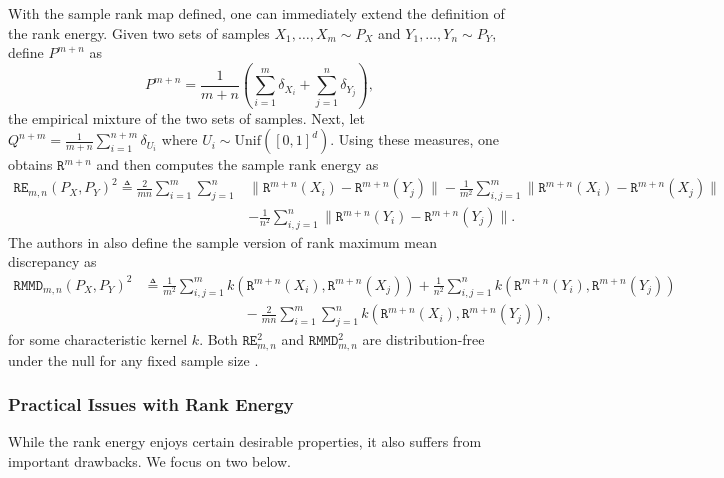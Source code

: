 \documentclass{article}
\theoremstyle{definition}
\newcommand{\Rn}{\mathtt{R}^{m+n}}
\newcommand{\REn}{\mathtt{RE}_{m,n}}
\begin{document}
With the sample rank map defined, one can immediately extend the definition of the rank energy. Given two sets of samples $X_1, \dots, X_m \sim P_X$ and $Y_1, \dots, Y_n \sim P_Y$, define $P^{m+n}$ as
\begin{equation*}
    P^{m+n} = \frac{1}{m+n}\left ( \sum_{i=1}^m \delta_{X_i} + \sum_{j=1}^n \delta_{Y_j} \right ),
\end{equation*} 
the empirical mixture of the two sets of samples. Next, let $Q^{n+m} =  \frac{1}{m+n}\sum_{i=1}^{n+m} \delta_{U_i}$ where $U_i \sim \text{Unif}([0,1]^d)$. Using these measures, one obtains $\Rn$ and then computes the sample rank energy as 
\begin{align} 
    \REn(P_X,P_Y)^2 \triangleq \frac{2}{mn}\sum_{i=1}^{m}\sum_{j=1}^n& \|\Rn(X_i)- \Rn(Y_j)\|- \frac{1}{m^2}\sum_{i,j=1}^{m}\|\Rn(X_i)- \Rn(X_j)\| \nonumber \\
    &- \frac{1}{n^2}\sum_{i,j=1}^{n}\|\Rn(Y_i)- \Rn(Y_j)\|. \label{eq:sre_mn}
\end{align}
The authors in \cite{deb2021multivariate} also define the sample version of rank maximum mean discrepancy as
\begin{align} 
        \mathtt{RMMD}_{m,n}(P_X,P_Y)^2 &\triangleq  \frac{1}{m^2} \sum_{i,j=1}^m k(\Rn(X_i),\Rn(X_j)) + \frac{1}{n^2} \sum_{i,j=1}^n k(\Rn(Y_i),\Rn(Y_j)) \nonumber \\
        & \hspace{3cm} - \frac{2}{mn} \sum_{i=1}^m\sum_{j=1}^n k(\Rn(X_i),\Rn(Y_j)), \label{eq:sample_rmmd}
\end{align}
for some characteristic kernel $k$.
Both $\REn^2$ and $\mathtt{RMMD}_{m,n}^2$ are distribution-free under the null for any fixed sample size \cite{deb2021multivariate}. 
\subsubsection{Practical Issues with Rank Energy}\label{subsec:IssuesWithRE}
While the rank energy enjoys certain desirable properties, it also suffers from important drawbacks.  We focus on two below.
\end{document}
